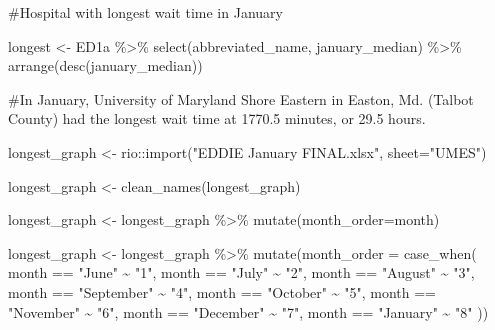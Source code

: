 \documentclass[
  letterpaper,
  DIV=11,
  numbers=noendperiod]{scrartcl}
\newenvironment{Shaded}{\begin{snugshade}}{\end{snugshade}}
\newcommand{\AttributeTok}[1]{\textcolor[rgb]{0.40,0.45,0.13}{#1}}
\newcommand{\CommentTok}[1]{\textcolor[rgb]{0.37,0.37,0.37}{#1}}
\newcommand{\FunctionTok}[1]{\textcolor[rgb]{0.28,0.35,0.67}{#1}}
\newcommand{\NormalTok}[1]{\textcolor[rgb]{0.00,0.23,0.31}{#1}}
\newcommand{\OtherTok}[1]{\textcolor[rgb]{0.00,0.23,0.31}{#1}}
\newcommand{\SpecialCharTok}[1]{\textcolor[rgb]{0.37,0.37,0.37}{#1}}
\newcommand{\StringTok}[1]{\textcolor[rgb]{0.13,0.47,0.30}{#1}}
\begin{document}
\begin{Shaded}
\begin{Highlighting}[]
\CommentTok{\#Hospital with longest wait time in January}

\NormalTok{longest }\OtherTok{\textless{}{-}}\NormalTok{ ED1a }\SpecialCharTok{\%\textgreater{}\%} 
  \FunctionTok{select}\NormalTok{(abbreviated\_name, january\_median) }\SpecialCharTok{\%\textgreater{}\%} 
  \FunctionTok{arrange}\NormalTok{(}\FunctionTok{desc}\NormalTok{(january\_median))}


\CommentTok{\#In January, University of Maryland Shore Eastern in Easton, Md. (Talbot County) had the longest wait time at 1770.5 minutes, or 29.5 hours.}


\NormalTok{longest\_graph }\OtherTok{\textless{}{-}}\NormalTok{ rio}\SpecialCharTok{::}\FunctionTok{import}\NormalTok{(}\StringTok{"EDDIE January FINAL.xlsx"}\NormalTok{, }\AttributeTok{sheet=}\StringTok{"UMES"}\NormalTok{)}

\NormalTok{longest\_graph }\OtherTok{\textless{}{-}} \FunctionTok{clean\_names}\NormalTok{(longest\_graph)}

\NormalTok{longest\_graph }\OtherTok{\textless{}{-}}\NormalTok{ longest\_graph }\SpecialCharTok{\%\textgreater{}\%} 
  \FunctionTok{mutate}\NormalTok{(}\AttributeTok{month\_order=}\NormalTok{month) }


\NormalTok{longest\_graph }\OtherTok{\textless{}{-}}\NormalTok{ longest\_graph }\SpecialCharTok{\%\textgreater{}\%}
  \FunctionTok{mutate}\NormalTok{(}\AttributeTok{month\_order =} \FunctionTok{case\_when}\NormalTok{(}
\NormalTok{     month }\SpecialCharTok{==} \StringTok{"June"} \SpecialCharTok{\textasciitilde{}} \StringTok{"1"}\NormalTok{,}
\NormalTok{    month }\SpecialCharTok{==} \StringTok{"July"} \SpecialCharTok{\textasciitilde{}} \StringTok{"2"}\NormalTok{,}
\NormalTok{     month }\SpecialCharTok{==} \StringTok{"August"} \SpecialCharTok{\textasciitilde{}} \StringTok{"3"}\NormalTok{,}
\NormalTok{     month }\SpecialCharTok{==} \StringTok{"September"} \SpecialCharTok{\textasciitilde{}} \StringTok{"4"}\NormalTok{,}
\NormalTok{    month }\SpecialCharTok{==} \StringTok{"October"} \SpecialCharTok{\textasciitilde{}} \StringTok{"5"}\NormalTok{,}
\NormalTok{     month }\SpecialCharTok{==} \StringTok{"November"} \SpecialCharTok{\textasciitilde{}} \StringTok{"6"}\NormalTok{,}
\NormalTok{     month }\SpecialCharTok{==} \StringTok{"December"} \SpecialCharTok{\textasciitilde{}} \StringTok{"7"}\NormalTok{,}
\NormalTok{     month }\SpecialCharTok{==} \StringTok{"January"} \SpecialCharTok{\textasciitilde{}} \StringTok{"8"}
\NormalTok{   ))}


\end{Highlighting}
\end{Shaded}
\end{document}

